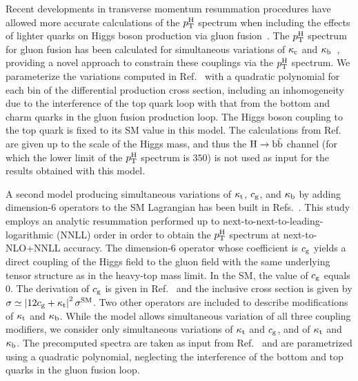 Recent developments in transverse momentum resummation procedures have allowed more accurate calculations of the $p_\mathrm{T}^\mathrm{H}$ spectrum when including the effects of lighter quarks on Higgs boson production via gluon fusion~\cite{Banfi:2013eda,Bozzi:2003jy,Becher:2010tm,Monni:2016ktx}.
% 
The $p_\mathrm{T}^\mathrm{H}$ spectrum for gluon fusion has been calculated for simultaneous variations of $\kappa_{\mathrm{c}}$ and $\kappa_{\mathrm{b}}$~\cite{Bishara:2016jga}, providing a novel approach to constrain these couplings via the $p_\mathrm{T}^\mathrm{H}$ spectrum.
% 
We parameterize the variations computed in Ref.~\cite{Bishara:2016jga} with a quadratic polynomial for each bin of the differential production cross section, including an inhomogeneity due to the interference of the top quark loop with that from the bottom and charm quarks in the gluon fusion production loop.
% 
The Higgs boson coupling to the top quark is fixed to its SM value in this model.
% 
The calculations from Ref.~\cite{Bishara:2016jga} are given up to the scale of the Higgs mass, and thus the $\mathrm{H}\to\mathrm{b}\bar{\mathrm{b}}$ channel (for which the lower limit of the $p_\mathrm{T}^\mathrm{H}$ spectrum is $350$\GeV) is not used as input for the results obtained with this model.


A second model producing simultaneous variations of $\kappa_{\mathrm{t}}$, $c_\mathrm{g}$, and $\kappa_{\mathrm{b}}$ by adding dimension-6 operators to the SM Lagrangian has been built in Refs.~\cite{Grazzini:2017szg,Grazzini:2016paz}.
% 
This study employs an analytic resummation performed up to next-to-next-to-leading-logarithmic (NNLL) order in order to obtain the $p_\mathrm{T}^\mathrm{H}$ spectrum at next-to-NLO+NNLL accuracy.
% 
The dimension-6 operator whose coefficient is $c_\mathrm{g}$ yields a direct coupling of the Higgs field to the gluon field with the same underlying tensor structure as in the heavy-top mass limit.
% 
In the SM, the value of $c_\mathrm{g}$ equals 0.
% 
The derivation of $c_\mathrm{g}$ is given in Ref.~\cite{Grazzini:2017szg} and the inclusive cross section is given by $\sigma \simeq \left| 12c_\mathrm{g} + \kappa_{\mathrm{t}} \right|^2 \sigma^\text{SM}$.
% 
Two other operators are included to describe modifications of $\kappa_{\mathrm{t}}$ and $\kappa_{\mathrm{b}}$.
% 
While the model allows simultaneous variation of all three coupling modifiers, we consider only simultaneous variations of $\kappa_{\mathrm{t}}$ and $c_\mathrm{g}$, and of $\kappa_{\mathrm{t}}$ and $\kappa_{\mathrm{b}}$.
% 
The precomputed spectra are taken as input from Ref.~\cite{Grazzini:2017szg} and are parametrized using a quadratic polynomial, neglecting the interference of the bottom and top quarks in the gluon fusion loop.







